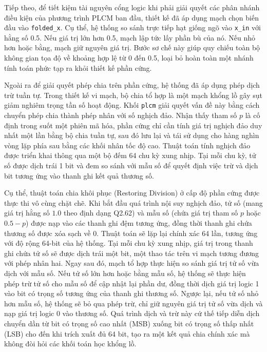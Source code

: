 Tiếp theo, để tiết kiệm tài nguyên cổng logic khi phải giải quyết các phân nhánh điều kiện của phương trình PLCM ban đầu, thiết kế đã áp dụng mạch chọn biến đầu vào \texttt{folded\_x}. Cụ thể, hệ thống so sánh trực tiếp hạt giống ngõ vào \texttt{x\_in} với hằng số 0.5. Nếu giá trị lớn hơn 0.5, mạch lập tức lấy phần bù của nó. Nếu nhỏ hơn hoặc bằng, mạch giữ nguyên giá trị. Bước sơ chế này giúp quy chiếu toàn bộ không gian tọa độ về khoảng hợp lệ từ 0 đến 0.5, loại bỏ hoàn toàn một nhánh tính toán phức tạp ra khỏi thiết kế phần cứng.

Ngoài ra để giải quyết phép chia trên phần cứng, hệ thống đã áp dụng phép dịch trừ tuần tự. Trong thiết kế vi mạch, bộ chia tổ hợp là một mạch khổng lồ gây sụt giảm nghiêm trọng tần số hoạt động. Khối \texttt{plcm} giải quyết vấn đề này bằng cách chuyển phép chia thành phép nhân với số nghịch đảo. Nhận thấy tham số $p$ là cố định trong suốt một phiên mã hóa, phần cứng chỉ cần tính giá trị nghịch đảo duy nhất một lần bằng bộ chia tuần tự, sau đó lưu lại và tái sử dụng cho hàng nghìn vòng lặp phía sau bằng các khối nhân tốc độ cao. Thuật toán tính nghịch đảo được triển khai thông qua một bộ đếm 64 chu kỳ xung nhịp. Tại mỗi chu kỳ, tử số được dịch trái 1 bit và đem so sánh với mẫu số để quyết định việc trừ và dịch bit tương ứng vào thanh ghi kết quả thương số.

Cụ thể, thuật toán chia khôi phục (Restoring Division) ở cấp độ phần cứng được thực thi vô cùng chặt chẽ. Khi bắt đầu quá trình nội suy nghịch đảo, tử số (mang giá trị hằng số $1.0$ theo định dạng Q2.62) và mẫu số (chứa giá trị tham số $p$ hoặc $0.5-p$) được nạp vào các thanh ghi đệm tương ứng, đồng thời thanh ghi chứa thương số được xóa sạch về 0. Thuật toán sẽ lặp lại chính xác 64 lần, tương ứng với độ rộng 64-bit của hệ thống. Tại mỗi chu kỳ xung nhịp, giá trị trong thanh ghi chứa tử số sẽ được dịch trái một bit, một thao tác trên vi mạch tương đương với phép nhân hai. Ngay sau đó, mạch tổ hợp thực hiện so sánh giá trị tử số vừa dịch với mẫu số. Nếu tử số lớn hơn hoặc bằng mẫu số, hệ thống sẽ thực hiện phép trừ tử số cho mẫu số để cập nhật lại phần dư, đồng thời dịch giá trị logic 1 vào bit có trọng số tương ứng của thanh ghi thương số. Ngược lại, nếu tử số nhỏ hơn mẫu số, hệ thống sẽ bỏ qua phép trừ, chỉ giữ nguyên giá trị tử số vừa dịch và nạp giá trị logic 0 vào thương số. Quá trình dịch và trừ này cứ thế tiếp diễn dịch chuyển dần từ bit có trọng số cao nhất (MSB) xuống bit có trọng số thấp nhất (LSB) cho đến khi trích xuất đủ 64 bit, tạo ra một kết quả chia chính xác mà không đòi hỏi các khối toán học khổng lồ.

